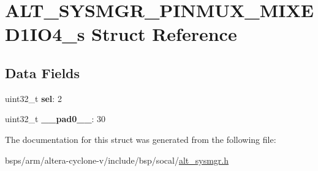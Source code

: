 \hypertarget{structALT__SYSMGR__PINMUX__MIXED1IO4__s}{}\section{A\+L\+T\+\_\+\+S\+Y\+S\+M\+G\+R\+\_\+\+P\+I\+N\+M\+U\+X\+\_\+\+M\+I\+X\+E\+D1\+I\+O4\+\_\+s Struct Reference}
\label{structALT__SYSMGR__PINMUX__MIXED1IO4__s}
\subsection*{Data Fields}
\begin{DoxyCompactItemize}
\item 
\mbox{\label{structALT__SYSMGR__PINMUX__MIXED1IO4__s_a9cedefe1adf205ada94c9dfc07f81ed9}} 
uint32\+\_\+t {\bfseries sel}\+: 2
\item 
\mbox{\label{structALT__SYSMGR__PINMUX__MIXED1IO4__s_a3ff52369868e997704ee4e452680abef}} 
uint32\+\_\+t {\bfseries \+\_\+\+\_\+pad0\+\_\+\+\_\+}\+: 30
\end{DoxyCompactItemize}


The documentation for this struct was generated from the following file\+:\begin{DoxyCompactItemize}
\item 
bsps/arm/altera-\/cyclone-\/v/include/bsp/socal/\mbox{\hyperlink{alt__sysmgr_8h}{alt\+\_\+sysmgr.\+h}}\end{DoxyCompactItemize}
